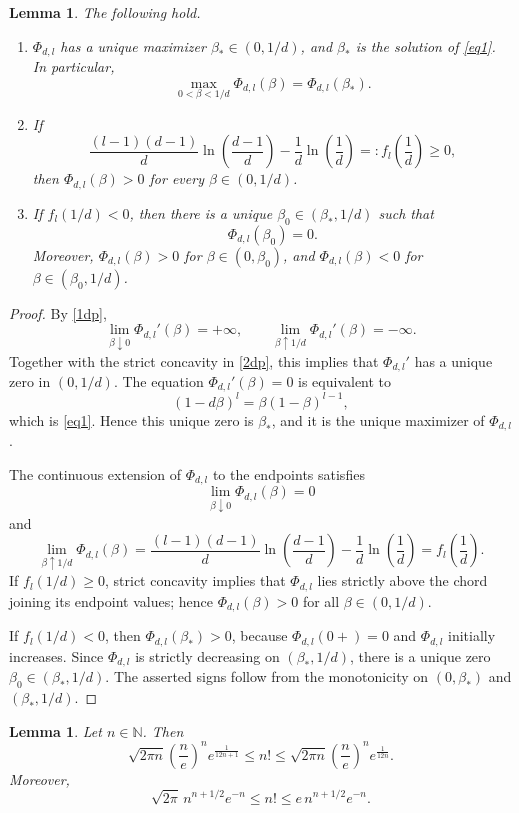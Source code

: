 \documentclass[11pt]{amsart}
\theoremstyle{plain}
\newtheorem{lemma}[theorem]{Lemma}
\numberwithin{equation}{section}
\numberwithin{theorem}{section}
\numberwithin{figure}{section}
\begin{document}
\begin{lemma}\label{lm21}
The following hold.
\begin{enumerate}
\item $\Phi_{d,l}$ has a unique maximizer $\beta_*\in(0,1/d)$, and $\beta_*$ is the solution of \eqref{eq1}.  In particular,
\[
\max_{0<\beta<1/d}\Phi_{d,l}(\beta)=\Phi_{d,l}(\beta_*).
\]
\item If
\[
\frac{(l-1)(d-1)}{d}\ln\left(\frac{d-1}{d}\right)
-\frac1d\ln\left(\frac1d\right)
=:f_l\left(\frac1d\right)\geq 0,
\]
then $\Phi_{d,l}(\beta)>0$ for every $\beta\in(0,1/d)$.
\item If $f_l(1/d)<0$, then there is a unique $\beta_0\in(\beta_*,1/d)$ such that
\[
\Phi_{d,l}(\beta_0)=0.
\]
Moreover, $\Phi_{d,l}(\beta)>0$ for $\beta\in(0,\beta_0)$, and $\Phi_{d,l}(\beta)<0$ for $\beta\in(\beta_0,1/d)$.
\end{enumerate}
\end{lemma}

\begin{proof}
By \eqref{1dp},
\[
\lim_{\beta\downarrow0}\Phi_{d,l}'(\beta)=+\infty,
\qquad
\lim_{\beta\uparrow1/d}\Phi_{d,l}'(\beta)=-\infty.
\]
Together with the strict concavity in \eqref{2dp}, this implies that $\Phi_{d,l}'$ has a unique zero in $(0,1/d)$.  The equation $\Phi_{d,l}'(\beta)=0$ is equivalent to
\[
(1-d\beta)^l=\beta(1-\beta)^{l-1},
\]
which is \eqref{eq1}.  Hence this unique zero is $\beta_*$, and it is the unique maximizer of $\Phi_{d,l}$.

The continuous extension of $\Phi_{d,l}$ to the endpoints satisfies
\[
\lim_{\beta\downarrow0}\Phi_{d,l}(\beta)=0
\]
and
\[
\lim_{\beta\uparrow1/d}\Phi_{d,l}(\beta)
=\frac{(l-1)(d-1)}{d}\ln\left(\frac{d-1}{d}\right)
-\frac1d\ln\left(\frac1d\right)
=f_l\left(\frac1d\right).
\]
If $f_l(1/d)\geq0$, strict concavity implies that $\Phi_{d,l}$ lies strictly above the chord joining its endpoint values; hence $\Phi_{d,l}(\beta)>0$ for all $\beta\in(0,1/d)$.

If $f_l(1/d)<0$, then $\Phi_{d,l}(\beta_*)>0$, because $\Phi_{d,l}(0+)=0$ and $\Phi_{d,l}$ initially increases.  Since $\Phi_{d,l}$ is strictly decreasing on $(\beta_*,1/d)$, there is a unique zero $\beta_0\in(\beta_*,1/d)$.  The asserted signs follow from the monotonicity on $(0,\beta_*)$ and $(\beta_*,1/d)$.
\end{proof}

\begin{lemma}\label{l12}
Let $n\in\mathbb{N}$.  Then
\begin{equation}
\sqrt{2\pi n}\left(\frac{n}{e}\right)^n e^{\frac{1}{12n+1}}
\leq n!\leq
\sqrt{2\pi n}\left(\frac{n}{e}\right)^n e^{\frac{1}{12n}}.
\label{bnf}
\end{equation}
Moreover,
\[
\sqrt{2\pi}\, n^{n+1/2}e^{-n}\leq n!\leq e\, n^{n+1/2}e^{-n}.
\]
\end{lemma}
\end{document}
